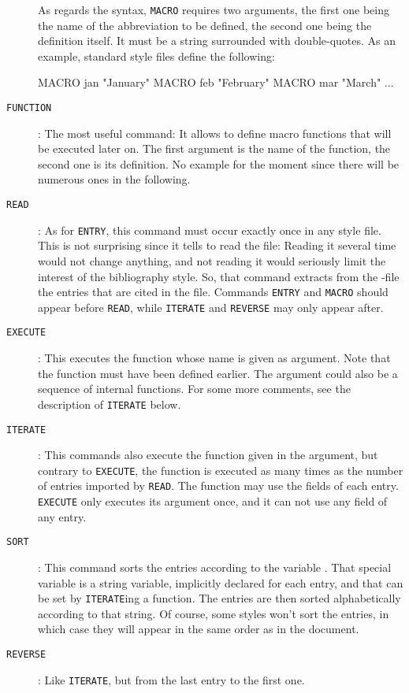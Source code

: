 \begin{description}
  As regards the syntax, \texttt{MACRO} requires two arguments, the first one
  being the name of the abbreviation to be defined, the second one being the
  definition itself. It must be a string surrounded with double-quotes.
  As an example, standard style files define the following:
\begin{myexv}
\begin{verbatimtab}
MACRO {jan} {"January"}
MACRO {feb} {"February"}
MACRO {mar} {"March"}
...
\end{verbatimtab}
\end{myexv}
\item[\texttt{FUNCTION}]: The most useful
  command: It allows to define macro functions that will be executed later on.
  The first argument is the name of the function, the second one is its
  definition. No example for the moment since there will be numerous ones in
  the following.
\item[\texttt{READ}]: As for \texttt{ENTRY},
  this command must occur exactly once in any  style file. This is
  not surprising since it tells \bt to read the  file: Reading it
  several time would not change anything, and not reading it would seriously limit the
  interest of the bibliography style. So, that command extracts from the
  -file the entries that are cited in the  file. Commands
  \texttt{ENTRY} and \texttt{MACRO} should appear before \texttt{READ}, while
  \texttt{ITERATE} and \texttt{REVERSE} may only  appear after.
\item[\texttt{EXECUTE}]: This executes
  the function whose name is given as argument. Note that the function must 
  have been defined earlier. The argument could also be a sequence of \bt
  internal functions. For some more comments, see the
  description of \texttt{ITERATE} below.
\item[\texttt{ITERATE}]: 
This commands also execute the function given in the argument, but contrary to
\texttt{EXECUTE}, the function is executed as many times as the number of
entries imported by \texttt{READ}. The function may use the fields of
each entry. \texttt{EXECUTE} only executes its argument once, and it can not
use any field of any entry.
\item[\texttt{SORT}]: 
This command sorts the entries according to the variable . That
special variable is a string variable, implicitly declared for each entry,
and that can be set by \texttt{ITERATE}{}ing a function. The entries are then
sorted alphabetically according to that string. Of course, some styles won't
sort the entries, in which case they will appear in the same order as in the
document. 
\item[\texttt{REVERSE}]: 
Like \texttt{ITERATE}, but from the last entry to the first one.
\end{description}

